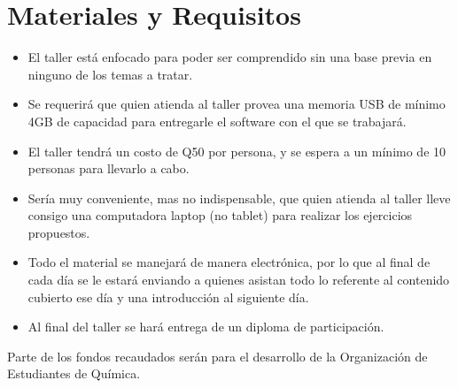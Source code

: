 \documentclass[10pt,letterpaper]{article}
\begin{document}
\section{Materiales y Requisitos}
\begin{itemize}
\item El taller est\'a enfocado para poder ser comprendido sin una base previa en ninguno de los temas a tratar.
\item Se requerir\'a que quien atienda al taller provea una memoria USB de m\'inimo 4GB de capacidad para entregarle el software con el que se trabajar\'a.
\item El taller tendr\'a un costo de Q50 por persona, y se espera a un m\'inimo de 10 personas para llevarlo a cabo.
\item Ser\'ia muy conveniente, mas no indispensable, que quien atienda al taller lleve consigo una computadora laptop (no tablet) para realizar los ejercicios propuestos.
\item Todo el material se manejar\'a de manera electr\'onica, por lo que al final de cada d\'ia se le estar\'a enviando a quienes asistan todo lo referente al contenido cubierto ese d\'ia y una introducci\'on al siguiente d\'ia.
\item Al final del taller se har\'a entrega de un diploma de participaci\'on.
\end{itemize}

Parte de los fondos recaudados ser\'an para el desarrollo de la Organizaci\'on de Estudiantes de Qu\'imica.
\end{document}
